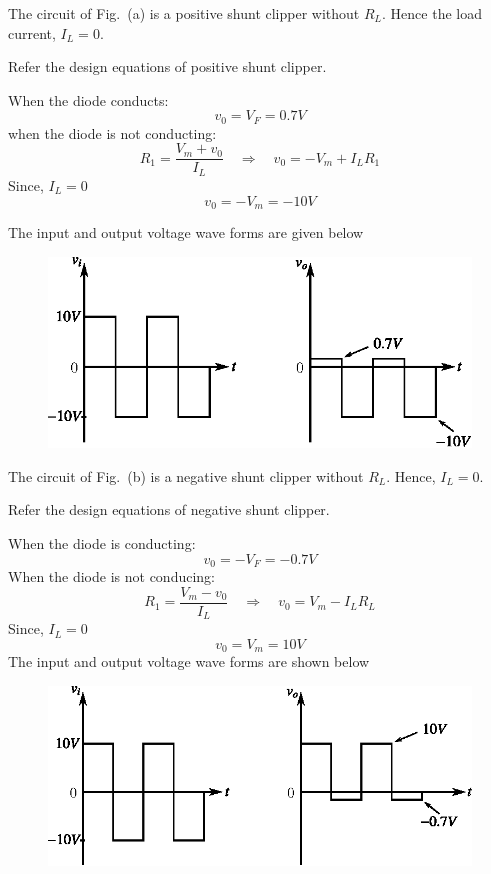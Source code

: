 \begin{solution}
The circuit of Fig.~(a) is a positive shunt clipper without $R_{L}$. Hence the load current, $I_{L}=0$.

Refer the design equations of positive shunt clipper.

When the diode conducts:
$$
v_{0}=V_{F}=0.7V
$$
when the diode is not conducting:
$$
R_{1}=\dfrac{V_{m}+v_{0}}{I_{L}}\quad\Rightarrow\quad v_{0}=-V_{m}+I_{L}R_{1}
$$
Since, $I_{L}=0$
$$
v_{0}=-V_{m}=-10V
$$

The input and output voltage wave forms are given below
\begin{figure}[H]
\centering
\includegraphics{chap2/sol2.43a.eps}
\end{figure}

The circuit of Fig.~(b) is a negative shunt clipper without $R_{L}$. Hence, $I_{L}=0$.

Refer the design equations of negative shunt clipper.

When the diode is conducting:
$$
v_{0}=-V_{F}=-0.7V
$$
When the diode is not conducing:
$$
R_{1}=\frac{V_{m}-v_{0}}{I_{L}}\quad\Rightarrow\quad v_{0}=V_{m}-I_{L}R_{L}
$$
Since, $I_{L}=0$
$$
v_{0}=V_{m}=10V
$$
The input and output voltage wave forms are shown below
\begin{figure}[H]
\centering
\includegraphics{chap2/sol2.43b.eps}
\end{figure}
\vskip -1cm
\end{solution}

